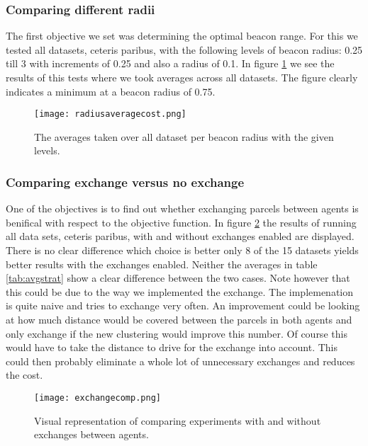 \documentclass[../main.tex]{subfiles}
\begin{document}
\subsubsection{Comparing different radii}
The first objective we set was determining the optimal beacon range.
For this we tested all datasets, ceteris paribus, with the following levels of beacon radius: 0.25 till 3 with increments of 0.25 and also a radius of 0.1.  
In figure \ref{fig:rad} we see the results of this tests where we took averages across all datasets.
The figure clearly indicates a minimum at a beacon radius of 0.75.
\begin{figure}
	\centering
	\texttt{[image: radiusaveragecost.png]}
	\caption{The averages taken over all dataset per beacon radius with the given levels.}
	\label{fig:rad}
\end{figure}

\subsubsection{Comparing exchange versus no exchange}
One of the objectives is to find out whether exchanging parcels between agents is benifical with respect to the objective function.
In figure \ref{fig:exch} the results of running all data sets, ceteris paribus, with and without exchanges enabled are displayed.
There is no clear difference which choice is better only 8 of the 15 datasets yields better results with the exchanges enabled.
Neither the averages in table \ref{tab:avgstrat} show a clear difference between the two cases.
Note however that this could be due to the way we implemented the exchange. 
The implemenation is quite naive and tries to exchange very often. 
An improvement could be looking at how much distance would be covered between the parcels in both agents and only exchange if the new clustering would improve this number.
Of course this would have to take the distance to drive for the exchange into account.
This could then probably eliminate a whole lot of unnecessary exchanges and reduces the cost.

\begin{figure}
	\centering
	\texttt{[image: exchangecomp.png]}
	\caption{Visual representation of comparing experiments with and without exchanges between agents.}
	\label{fig:exch}
\end{figure}
\end{document}
